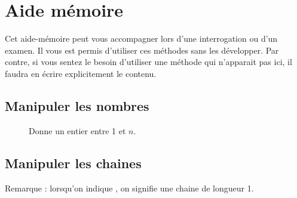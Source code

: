 \chapter{Aide mémoire}

	Cet aide-mémoire peut vous accompagner lors d'une
	interrogation ou d'un examen. 
	Il vous est permis d’utiliser ces méthodes sans les développer.
	Par contre, si vous sentez le besoin d’utiliser 
	une méthode qui n'apparait pas ici, 
	il faudra en écrire explicitement le contenu.

\section*{Manipuler les nombres}

	\begin{description}
	\item[]
		Donne un entier entre 1 et $n$.
	\end{description}
	
	
\section*{Manipuler les chaines}
	
	Remarque : lorsqu'on indique ,
	on signifie une chaine de longueur 1.
	
